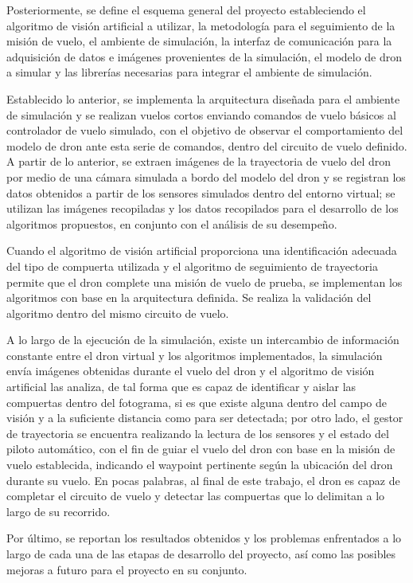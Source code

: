 Posteriormente, se define el esquema general del proyecto estableciendo el algoritmo de visión artificial a utilizar, la metodología para el seguimiento de la misión de vuelo, el ambiente de simulación, la interfaz de comunicación para la adquisición de datos e imágenes provenientes de la simulación, el modelo de dron a simular y las librerías necesarias para integrar el ambiente de simulación.

Establecido lo anterior, se implementa la arquitectura diseñada para el ambiente de simulación y se realizan vuelos cortos enviando comandos de vuelo básicos al controlador de vuelo simulado, con el objetivo de observar el comportamiento del modelo de dron ante esta serie de comandos, dentro del circuito de vuelo definido. A partir de lo anterior, se extraen imágenes de la trayectoria de vuelo del dron por medio de una cámara simulada a bordo del modelo del dron y se registran los datos obtenidos a partir de los sensores simulados dentro del entorno virtual; se utilizan las imágenes recopiladas y los datos recopilados para el desarrollo de los algoritmos propuestos, en conjunto con el análisis de su desempeño.

Cuando el algoritmo de visión artificial proporciona una identificación adecuada del tipo de compuerta utilizada y el algoritmo de seguimiento de trayectoria permite que el dron complete una misión de vuelo de prueba, se implementan los algoritmos con base en la arquitectura definida. Se realiza la validación del algoritmo dentro del mismo circuito de vuelo. 

A lo largo de la ejecución de la simulación, existe un intercambio de información constante entre el dron virtual y los algoritmos implementados, la simulación envía imágenes obtenidas durante el vuelo del dron y el algoritmo de visión artificial las analiza, de tal forma que es capaz de identificar y aislar las compuertas dentro del fotograma, si es que existe alguna dentro del campo de visión y a la suficiente distancia como para ser detectada; por otro lado, el gestor de trayectoria se encuentra realizando la lectura de los sensores y el estado del piloto automático, con el fin de guiar el vuelo del dron con base en la misión de vuelo establecida, indicando el waypoint pertinente según la ubicación del dron durante su vuelo. En pocas palabras, al final de este trabajo, el dron es capaz de completar el circuito de vuelo y detectar las compuertas que lo delimitan a lo largo de su recorrido.

Por último, se reportan los resultados obtenidos y los problemas enfrentados a lo largo de cada una de las etapas de desarrollo del proyecto, así como las posibles mejoras a futuro para el proyecto en su conjunto.



